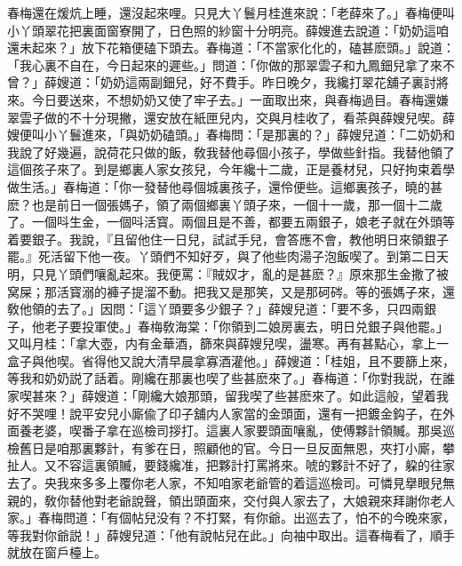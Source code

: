 春梅還在煖炕上睡，還沒起來哩。只見大丫鬟月桂進來說：「老薛來了。」春梅便叫小丫頭翠花把裏面窗寮開了，日色照的紗窗十分明亮。薛嫂進去說道：「奶奶這咱還未起來？」放下花箱便磕下頭去。春梅道：「不當家化化的，磕甚麽頭。」說道：「我心裏不自在，今日起來的遲些。」問道：「你做的那翠雲子和九鳳鈿兒拿了來不曾？」薛嫂道：「奶奶這兩副鈿兒，好不費手。昨日晚夕，我纔打翠花舖子裏討將來。今日要送來，不想奶奶又使了牢子去。」一面取出來，與春梅過目。春梅還嫌翠雲子做的不十分現撇，還安放在紙匣兒内，交與月桂收了，看茶與薛嫂兒喫。薛嫂便叫小丫鬟進來，「與奶奶磕頭。」春梅問：「是那裏的？」薛嫂兒道：「二奶奶和我說了好幾遍，說荷花只做的飯，敎我替他尋個小孩子，學做些針指。我替他領了這個孩子來了。到是鄉裏人家女孩兒，今年纔十二歲，正是養材兒，只好拘束着學做生活。」春梅道：「你一發替他尋個城裏孩子，還伶便些。這鄉裏孩子，曉的甚麽？也是前日一個張媽子，領了兩個鄉裏丫頭子來，一個十一歲，那一個十二歲了。一個呌生金，一個呌活寳。兩個且是不善，都要五兩銀子，娘老子就在外頭等着要銀子。我說，『且留他住一日兒，試試手兒，會答應不會，教他明日來領銀子罷。』死活留下他一夜。丫頭們不知好歹，與了他些肉湯子泡飯喫了。到第二日天明，只見丫頭們嚷亂起來。我便罵：『賊奴才，亂的是甚麽？』原來那生金撒了被窝屎；那活寳溺的褲子提溜不動。把我又是那笑，又是那砢硶。等的張媽子來，還敎他領的去了。」因問：「這丫頭要多少銀子？」薛嫂兒道：「要不多，只四兩銀子，他老子要投軍使。」春梅敎海棠：「你領到二娘房裏去，明日兑銀子與他罷。」又叫月桂：「拿大壺，内有金華酒，篩來與薛嫂兒喫，盪寒。再有甚點心，拿上一盒子與他喫。省得他又說大清早晨拿寡酒灌他。」薛嫂道：「桂姐，且不要篩上來，等我和奶奶説了話着。剛纔在那裏也喫了些甚麽來了。」春梅道：「你對我説，在誰家喫甚來？」薛嫂道：「剛纔大娘那頭，留我喫了些甚麽來了。如此這般，望着我好不哭哩！說平安兒小廝偸了印子舖内人家當的金頭面，還有一把鍍金鈎子，在外面養老婆，喫番子拿在巡檢司拶打。這裏人家要頭面嚷亂，使傅夥計領贓。那吳巡檢舊日是咱那裏夥計，有爹在日，照顧他的官。今日一旦反面無恩，夾打小廝，攀扯人。又不容這裏領贓，要錢纔准，把夥計打罵將來。唬的夥計不好了，躱的往家去了。央我來多多上覆你老人家，不知咱家老爺管的着這巡檢司。可憐見擧眼兒無親的，敎你替他對老爺說聲，領出頭面來，交付與人家去了，大娘親來拜謝你老人家。」春梅問道：「有個帖兒没有？不打緊，有你爺。出巡去了，怕不的今晚來家，等我對你爺説！」薛嫂兒道：「他有說帖兒在此。」向袖中取出。這春梅看了，順手就放在窗戶檯上。


